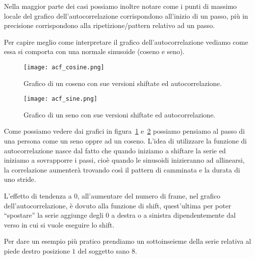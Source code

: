 Nella maggior parte dei casi possiamo inoltre notare come i punti di massimo locale del grafico
dell'autocorrelazione corrispondono all'inizio di un passo, più in precisione corrispondono 
alla ripetizione/pattern relativo ad un passo.

Per capire meglio come interpretare il grafico dell'autocorrelazione vediamo come essa si comporta
con una normale sinusoide (coseno e seno).

\begin{figure}[H]
    \centering
    \texttt{[image: acf\_cosine.png]}
    \caption{Grafico di un coseno con sue versioni shiftate ed autocorrelazione.}
    \label{fig:acf_cosine}
\end{figure}
\begin{figure}[H]
    \centering
    \texttt{[image: acf\_sine.png]}
    \caption{Grafico di un seno con sue versioni shiftate ed autocorrelazione.}
    \label{fig:acf_sine}
\end{figure}

Come possiamo vedere dai grafici in figura~\ref{fig:acf_cosine} e~\ref{fig:acf_sine} 
possiamo pensiamo al passo di una persona come un seno oppre ad un coseno. L'idea di utilizzare la
funzione di autocorrelazione nasce dal fatto che quando iniziamo a shiftare la serie
ed iniziamo a sovrapporre i passi, cioè quando le sinusoidi inizieranno ad allinearsi,
la correlazione aumenterà trovando così il pattern di camminata e la durata di uno stride.

\begin{sloppypar}
L'effetto di tendenza a $0$, all'aumentare del numero di frame, nel grafico dell'autocorrelazione,
è dovuto alla funzione di shift, quest'ultima per poter ``spostare'' la serie aggiunge degli $0$
a destra o a sinistra dipendentemente dal verso in cui si vuole eseguire lo shift.
\end{sloppypar}


Per dare un esempio più pratico prendiamo un sottoinseieme della serie relativa al piede 
destro posizione $1$ del soggetto sano $8$.

